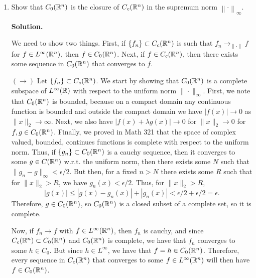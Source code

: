 \documentclass[11pt]{article}
\newcommand{\norm}[1]{\left\lVert #1 \right\rVert}
\begin{document}
\begin{enumerate}[leftmargin=*, label=\arabic*.]
    \item Show that $C_0(\mathbb{R}^n)$ is the closure of $C_c(\mathbb{R}^n)$ in the supremum norm $\norm{\cdot}_{\infty}$.


        \textbf{Solution.}

        We need to show two things. First, if $\{f_{n}\} \subset C_{c}(\mathbb{R}^{n})$ is such that $f_n \to_{\|\cdot \|} f$ for $f \in L^{\infty}(\mathbb{R}^{n})$, then $f \in C_{0}(\mathbb{R}^{n})$.
        Next, if $f \in C_{c}(\mathbb{R}^{n})$, then there exists some sequence in $C_0(\mathbb{R}^{n})$ that converges to $f$.

        $(\rightarrow)$ Let $\{f_n\} \subset  C_{c}(\mathbb{R}^{n})$.
        We start by showing that $C_{0}(\mathbb{R}^{n})$ is a complete subspace of $L^{\infty}(\mathbb{R})$ with respect to the uniform norm $\|\cdot \|_{\infty}$.
        First, we note that $C_0(\mathbb{R}^{n})$ is bounded, because on a compact domain any continuous function is bounded and outside the compact domain we have $|f(x)| \to 0$ as $\|x\|_{2} \to \infty$.
        Next, we also have $|f(x) + \lambda g(x)| \to 0$ for $\|x\|_{2} \to 0$ for $f, g \in C_0(\mathbb{R}^{n})$.
        Finally, we proved in Math 321 that the space of complex valued, bounded, continues functions is complete with respect to the uniform norm.
        Thus, if $\{g_n\} \subset C_{0}(\mathbb{R}^{n})$ is a cauchy sequence, then it converges to some $g \in C(\mathbb{R}^{n})$ w.r.t. the uniform norm, then there exists some $N$ such that $\|g_n - g\|_{\infty} < \epsilon / 2$.
        But then, for a fixed $n > N$ there exists some $R$ such that for $\|x\|_{2} > R$, we have $g_n(x) < \epsilon / 2$.
        Thus, for $\|x\|_{2} > R$,
        \[
        |g(x)| \leq |g(x) - g_n(x)| + |g_n(x)| < \epsilon / 2 + \epsilon / 2 = \epsilon 
        .\] 
        Therefore, $g \in C_{0}(\mathbb{R}^{n})$, so $C_0(\mathbb{R}^{n})$ is a closed subset of a complete set, so it is complete.

        Now, if $f_n \to f$ with $f \in L^{\infty}(\mathbb{R}^{n})$, then $f_n$ is cauchy, and since $C_c(\mathbb{R}^{n}) \subset C_0(\mathbb{R}^{n})$ and $C_0(\mathbb{R}^{n})$ is complete, we have that $f_n$ converges to some $h \in C_0$. But since $h \in L^{\infty}$, we have that $f = h \in C_0(\mathbb{R}^{n})$.
        Therefore, every sequence in $C_c(\mathbb{R}^{n})$ that converges to some $f \in L^{\infty}(\mathbb{R}^{n})$ will then have $f \in C_0(\mathbb{R}^{n})$.


\end{enumerate}
\end{document}
